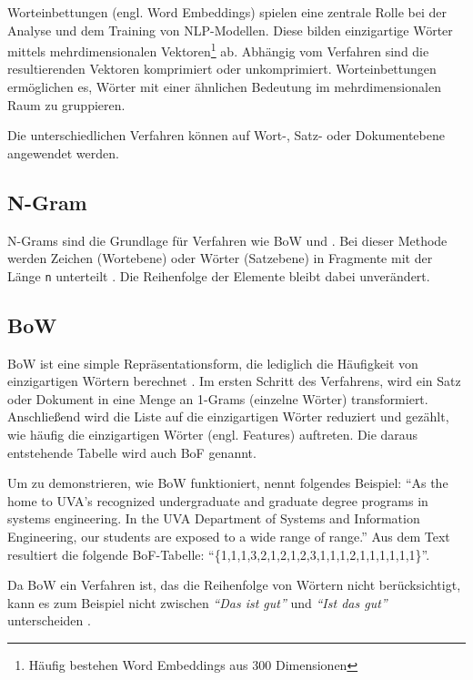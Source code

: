 
Worteinbettungen (engl. Word Embeddings) spielen eine zentrale Rolle bei der Analyse und dem Training von \ac{NLP}-Modellen. Diese bilden einzigartige Wörter mittels mehrdimensionalen Vektoren\footnote{Häufig bestehen Word Embeddings aus \num{300} Dimensionen} ab. Abhängig vom Verfahren sind die resultierenden Vektoren komprimiert oder unkomprimiert. Worteinbettungen ermöglichen es, Wörter mit einer ähnlichen Bedeutung im mehrdimensionalen Raum zu gruppieren.

Die unterschiedlichen Verfahren können auf Wort-, Satz- oder Dokumentebene angewendet werden.

\subsection*{N-Gram}

N-Grams sind die Grundlage für Verfahren wie \ac{BoW} und \ft. Bei dieser Methode werden Zeichen (Wortebene) oder Wörter (Satzebene) in Fragmente mit der Länge \texttt{n} unterteilt \autocite[5]{kowsari_text_2019}. Die Reihenfolge der Elemente bleibt dabei unverändert.

\subsection*{\acl{BoW}} 

\ac{BoW} ist eine simple Repräsentationsform, die lediglich die Häufigkeit von einzigartigen Wörtern berechnet \autocite[6]{kowsari_text_2019}. Im ersten Schritt des Verfahrens, wird ein Satz oder Dokument in eine Menge an 1-Grams (einzelne Wörter) transformiert. Anschließend wird die Liste auf die einzigartigen Wörter reduziert und gezählt, wie häufig die einzigartigen Wörter (engl. Features) auftreten. Die daraus entstehende Tabelle wird auch \ac{BoF} genannt.

Um zu demonstrieren, wie \ac{BoW} funktioniert, nennt \textcite[6]{kowsari_text_2019} folgendes Beispiel: \enquote{As the home to UVA’s recognized undergraduate and graduate degree programs in systems engineering. In the UVA Department of Systems and Information Engineering, our students are exposed to a wide range of range.} Aus dem Text resultiert die folgende \ac{BoF}-Tabelle: \enquote{\{1,1,1,3,2,1,2,1,2,3,1,1,1,2,1,1,1,1,1,1\}}.

Da \ac{BoW} ein Verfahren ist, das die Reihenfolge von Wörtern nicht berücksichtigt, kann es zum Beispiel nicht zwischen \textit{\enquote{Das ist gut}} und \textit{\enquote{Ist das gut}} unterscheiden \autocite[6]{kowsari_text_2019}.

